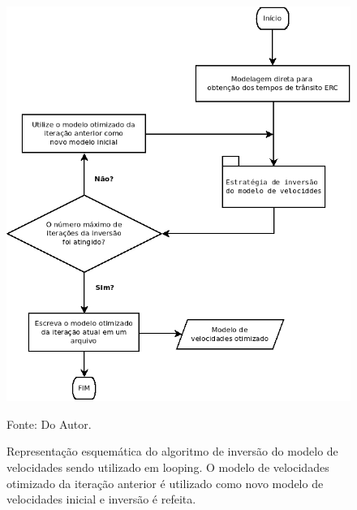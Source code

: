 \begin{figure}[H]
\caption{Representação esquemática do algoritmo de inversão do modelo de velocidades
sendo utilizado em looping. O modelo de velocidades otimizado da iteração anterior é utilizado
como novo modelo de velocidades inicial e inversão é refeita.}
\begin{center}
\includegraphics[scale=0.5]{images/fluxorepeat.png}
\vspace{-0.3cm}
\end{center}
\begin{center}
 Fonte: Do Autor.
\end{center}
\label{fig:9.10}
\end{figure}
